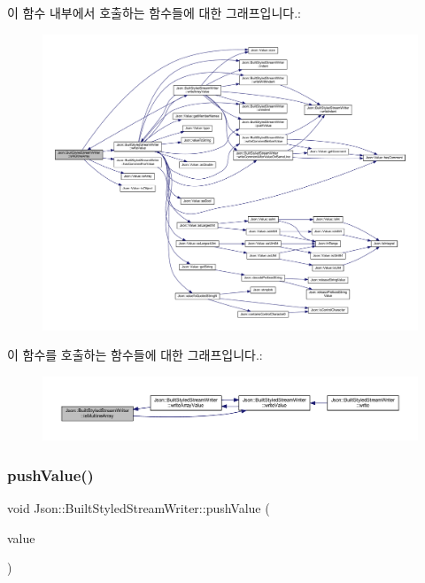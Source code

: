 이 함수 내부에서 호출하는 함수들에 대한 그래프입니다.\+:
\nopagebreak
\begin{figure}[H]
\begin{center}
\leavevmode
\includegraphics[width=350pt]{struct_json_1_1_built_styled_stream_writer_af423fd33b3d580506ea3efc53b05a077_cgraph}
\end{center}
\end{figure}
이 함수를 호출하는 함수들에 대한 그래프입니다.\+:\nopagebreak
\begin{figure}[H]
\begin{center}
\leavevmode
\includegraphics[width=350pt]{struct_json_1_1_built_styled_stream_writer_af423fd33b3d580506ea3efc53b05a077_icgraph}
\end{center}
\end{figure}
\mbox{\label{struct_json_1_1_built_styled_stream_writer_a91e8535508412eea04d77c0cafdf15aa}} 
\subsubsection{\texorpdfstring{push\+Value()}{pushValue()}}
{\footnotesize\ttfamily void Json\+::\+Built\+Styled\+Stream\+Writer\+::push\+Value (\begin{DoxyParamCaption}\item[{\hyperlink{json_8h_a1e723f95759de062585bc4a8fd3fa4be}{J\+S\+O\+N\+C\+P\+P\+\_\+\+S\+T\+R\+I\+NG} const \&}]{value }\end{DoxyParamCaption})\hspace{0.3cm}{\ttfamily [private]}}



